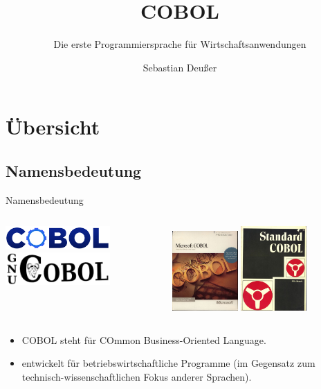 \documentclass{beamer}
\title[COBOL-\"Uberblick]   %
{COBOL}
\subtitle
{Die erste Programmiersprache für Wirtschaftsanwendungen} %
\author %
{Sebastian Deußer}
\begin{document}
\begin{frame}
  \titlepage
\end{frame}


\section{Übersicht}
\subsection{Namensbedeutung}
\begin{frame}{Namensbedeutung}
	\begin{columns}[c]
		\begin{column}{4cm}
			\includegraphics[width=4cm]{CobolCogLogo}\\ 
			\includegraphics[width=4cm]{GnuCOBOLLogoTransparent}
		\end{column}
		\begin{column}{6cm}
			\includegraphics[width=2.5cm]{DOSMSCOBOL45} \hspace{1.5pt}
			\includegraphics[width=2.5cm]{StandardCobol}
		\end{column}
	\end{columns}
	\begin{itemize}[<+->]
		\item
			COBOL steht für COmmon Business-Oriented Language.
		\item
			entwickelt für betriebswirtschaftliche Programme (im Gegensatz zum technisch-wissenschaftlichen Fokus anderer Sprachen).
	\end{itemize}
\end{frame}
\end{document}
